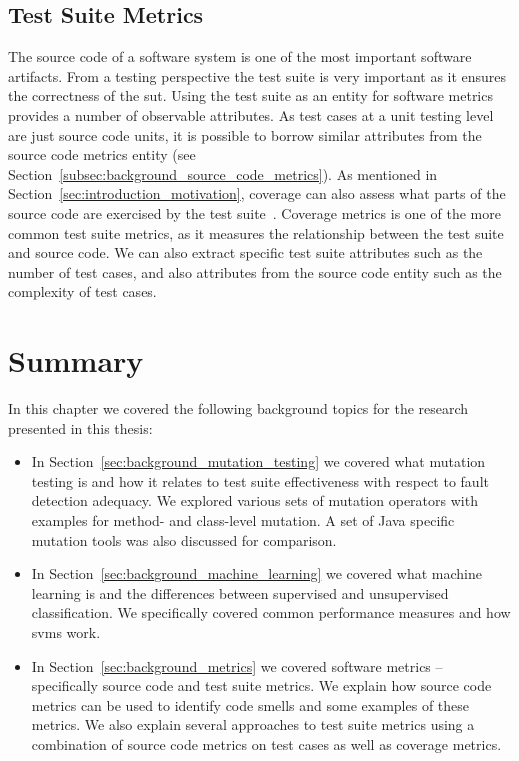 \subsection{Test Suite Metrics}
\label{subsec:background_test_suite_metrics}
The source code of a software system is one of the most important software artifacts. From a testing perspective the test suite is very important as it ensures the correctness of the \gls{sut}. Using the test suite as an entity for software metrics provides a number of observable attributes. As test cases at a unit testing level are just source code units, it is possible to borrow similar attributes from the source code metrics entity (see Section~\ref{subsec:background_source_code_metrics}). As mentioned in Section~\ref{sec:introduction_motivation}, coverage can also assess what parts of the source code are exercised by the test suite~\cite{ZHM97}. Coverage metrics is one of the more common test suite metrics, as it measures the relationship between the test suite and source code. We can also extract specific test suite attributes such as the number of test cases, and also attributes from the source code entity such as the complexity of test cases.


\section{Summary}
\label{sec:background_summary}
In this chapter we covered the following background topics for the research presented in this thesis:

\begin{itemize}
  \item In Section~\ref{sec:background_mutation_testing} we covered what mutation testing is and how it relates to test suite effectiveness with respect to fault detection adequacy. We explored various sets of mutation operators with examples for method- and class-level mutation. A set of Java specific mutation tools was also discussed  for comparison.
  \item In Section~\ref{sec:background_machine_learning} we covered what machine learning is and the differences between supervised and unsupervised classification. We specifically covered common performance measures and how \gls{svm}s work.
  \item In Section~\ref{sec:background_metrics} we covered software metrics -- specifically source code and test suite metrics. We explain how source code metrics can be used to identify code smells and some examples of these metrics. We also explain several approaches to test suite metrics using a combination of source code metrics on test cases as well as coverage metrics.
\end{itemize}
